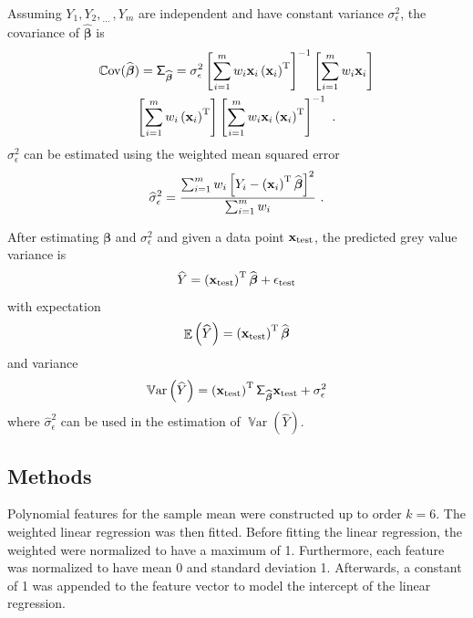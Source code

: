 \documentclass[12pt]{report}
\DeclareMathOperator{\expectation}{\mathbb{E}}
\DeclareMathOperator{\variance}{\mathbb{V}ar}
\DeclareMathOperator{\cov}{\mathbb{C}ov}
\newcommand{\T}{^\textup{T}}
\newcommand{\dotdotdot}{_{\phantom{.}\cdots}}
\newcommand{\vect}[1]{\mathbf{#1}}
\newcommand{\vectGreek}[1]{\boldsymbol{#1}}
\newcommand{\matr}[1]{\mathsf{#1}}
\begin{document}
Assuming $Y_1,Y_2,\dotdotdot,Y_m$ are independent and have constant variance $\sigma_\epsilon^2$, the covariance of $\widehat{\vectGreek{\beta}}$ is
\begin{multline}
\cov(\widehat{\vectGreek{\beta}})=\matr{\Sigma}_{\widehat{\vectGreek{\beta}}}=
\sigma_\epsilon^2\left[\sum_{i=1}^mw_i\vect{x}_i\left(\vect{x}_i\right)\T\right]^{-1}\left[\sum_{i=1}^mw_i\vect{x}_i\right]
\\
\left[\sum_{i=1}^mw_i\left(\vect{x}_i\right)\T\right]\left[\sum_{i=1}^mw_i\vect{x}_i\left(\vect{x}_i\right)\T\right]^{-1} \ .
\end{multline}
$\sigma_\epsilon^2$ can be estimated using the weighted mean squared error
\begin{equation}
\widehat{\sigma}_\epsilon^2=\frac{\sum_{i=1}^mw_i\left[Y_i-\left(\vect{x}_i\right)\T\widehat{\vectGreek{\beta}}\right]^2}{\sum_{i=1}^mw_i} \ .
\end{equation}

After estimating $\vectGreek{\beta}$ and $\sigma_\epsilon^2$ and given a data point $\vect{x}_{\textup{test}}$, the predicted grey value variance is
\begin{equation}
\widehat{Y}=\left(\vect{x}_{\textup{test}}\right)\T\widehat{\vectGreek{\beta}} + \epsilon_{\textup{test}}
\end{equation}
with expectation
\begin{equation}
\expectation\left({\widehat{Y}}\right)=\left(\vect{x}_{\textup{test}}\right)\T\widehat{\vectGreek{\beta}}
\end{equation}
and variance
\begin{equation}
\variance\left(\widehat{Y}\right)=\left(\vect{x}_{\textup{test}}\right)\T\matr{\Sigma}_{\widehat{\vectGreek{\beta}}}\vect{x}_{\textup{test}}+\sigma_\epsilon^2
\end{equation}
where $\widehat{\sigma}_\epsilon^2$ can be used in the estimation of $\variance\left(\widehat{Y}\right)$.

\subsection{Methods}
Polynomial features for the sample mean were constructed up to order $k=6$. The weighted linear regression was then fitted. Before fitting the linear regression, the weighted were normalized to have a maximum of 1. Furthermore, each feature was normalized to have mean 0 and standard deviation 1. Afterwards, a constant of 1 was appended to the feature vector to model the intercept of the linear regression.
\end{document}
